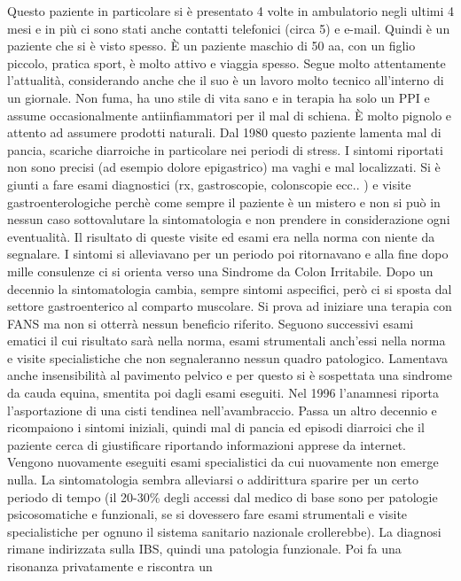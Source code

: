 \documentclass[]{article}
\begin{document}
Questo paziente in particolare si è presentato 4 volte in ambulatorio
negli ultimi 4 mesi e in più ci sono stati anche contatti telefonici
(circa 5) e e-mail. Quindi è un paziente che si è visto spesso. È un
paziente maschio di 50 aa, con un figlio piccolo, pratica sport, è molto
attivo e viaggia spesso. Segue molto attentamente l'attualità,
considerando anche che il suo è un lavoro molto tecnico all'interno di
un giornale. Non fuma, ha uno stile di vita sano e in terapia ha solo un
PPI e assume occasionalmente antiinfiammatori per il mal di schiena. È
molto pignolo e attento ad assumere prodotti naturali. Dal 1980 questo
paziente lamenta mal di pancia, scariche diarroiche in particolare nei
periodi di stress. I sintomi riportati non sono precisi (ad esempio
dolore epigastrico) ma vaghi e mal localizzati. Si è giunti a fare esami
diagnostici (rx, gastroscopie, colonscopie ecc.. ) e visite
gastroenterologiche perchè come sempre il paziente è un mistero e non si
può in nessun caso sottovalutare la sintomatologia e non prendere in
considerazione ogni eventualità. Il risultato di queste visite ed esami
era nella norma con niente da segnalare. I sintomi si alleviavano per un
periodo poi ritornavano e alla fine dopo mille consulenze ci si orienta
verso una Sindrome da Colon Irritabile. Dopo un decennio la
sintomatologia cambia, sempre sintomi aspecifici, però ci si sposta dal
settore gastroenterico al comparto muscolare. Si prova ad iniziare una
terapia con FANS ma non si otterrà nessun beneficio riferito. Seguono
successivi esami ematici il cui risultato sarà nella norma, esami
strumentali anch'essi nella norma e visite specialistiche che non
segnaleranno nessun quadro patologico. Lamentava anche insensibilità al
pavimento pelvico e per questo si è sospettata una sindrome da cauda
equina, smentita poi dagli esami eseguiti. Nel 1996 l'anamnesi riporta
l'asportazione di una cisti tendinea nell'avambraccio. Passa un altro
decennio e ricompaiono i sintomi iniziali, quindi mal di pancia ed
episodi diarroici che il paziente cerca di giustificare riportando
informazioni apprese da internet. Vengono nuovamente eseguiti esami
specialistici da cui nuovamente non emerge nulla. La sintomatologia
sembra alleviarsi o addirittura sparire per un certo periodo di tempo
(il 20-30\% degli accessi dal medico di base sono per patologie
psicosomatiche e funzionali, se si dovessero fare esami strumentali e
visite specialistiche per ognuno il sistema sanitario nazionale
crollerebbe). La diagnosi rimane indirizzata sulla IBS, quindi una
patologia funzionale. Poi fa una risonanza privatamente e riscontra un
\end{document}

